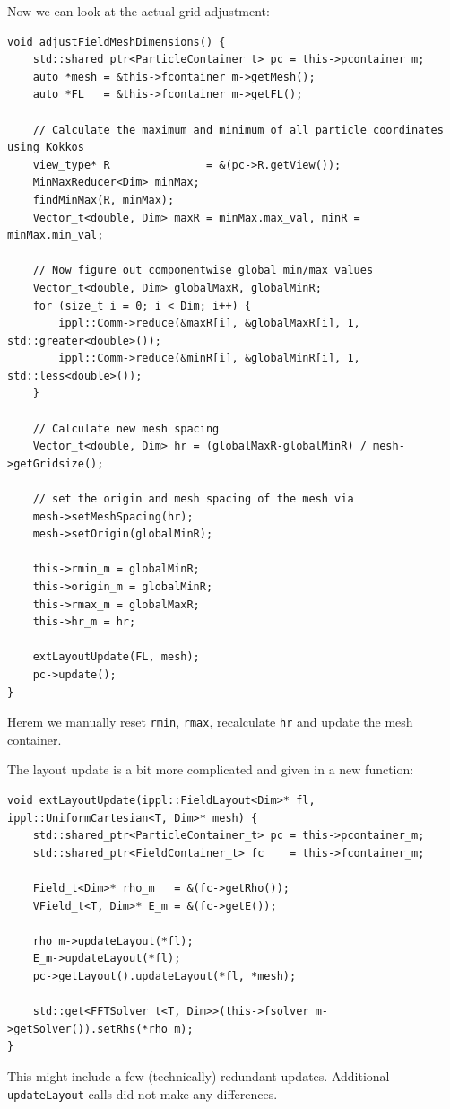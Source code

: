 Now we can look at the actual grid adjustment:
\begin{lstlisting}
void adjustFieldMeshDimensions() {
    std::shared_ptr<ParticleContainer_t> pc = this->pcontainer_m;
    auto *mesh = &this->fcontainer_m->getMesh();
    auto *FL   = &this->fcontainer_m->getFL();

    // Calculate the maximum and minimum of all particle coordinates using Kokkos
    view_type* R               = &(pc->R.getView());
    MinMaxReducer<Dim> minMax;
    findMinMax(R, minMax); 
    Vector_t<double, Dim> maxR = minMax.max_val, minR = minMax.min_val;
    
    // Now figure out componentwise global min/max values
    Vector_t<double, Dim> globalMaxR, globalMinR;
    for (size_t i = 0; i < Dim; i++) {
        ippl::Comm->reduce(&maxR[i], &globalMaxR[i], 1, std::greater<double>());
        ippl::Comm->reduce(&minR[i], &globalMinR[i], 1, std::less<double>());
    }

    // Calculate new mesh spacing 
    Vector_t<double, Dim> hr = (globalMaxR-globalMinR) / mesh->getGridsize(); 
    
    // set the origin and mesh spacing of the mesh via
    mesh->setMeshSpacing(hr);
    mesh->setOrigin(globalMinR); 

    this->rmin_m = globalMinR;
    this->origin_m = globalMinR;
    this->rmax_m = globalMaxR;
    this->hr_m = hr;

    extLayoutUpdate(FL, mesh);
    pc->update();
}
\end{lstlisting}
Herem we manually reset \verb|rmin|, \verb|rmax|, recalculate \verb|hr| and update the mesh container.

The layout update is a bit more complicated and given in a new function:
\begin{lstlisting}
void extLayoutUpdate(ippl::FieldLayout<Dim>* fl, ippl::UniformCartesian<T, Dim>* mesh) {
    std::shared_ptr<ParticleContainer_t> pc = this->pcontainer_m;
    std::shared_ptr<FieldContainer_t> fc    = this->fcontainer_m;

    Field_t<Dim>* rho_m   = &(fc->getRho());
    VField_t<T, Dim>* E_m = &(fc->getE());

    rho_m->updateLayout(*fl);
    E_m->updateLayout(*fl);
    pc->getLayout().updateLayout(*fl, *mesh);
    
    std::get<FFTSolver_t<T, Dim>>(this->fsolver_m->getSolver()).setRhs(*rho_m);
}
\end{lstlisting}
This might include a few (technically) redundant updates. Additional \verb|updateLayout| calls did not make any differences. 


